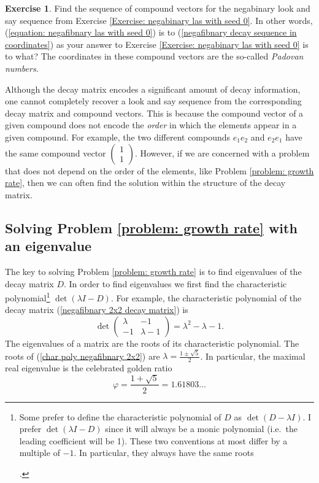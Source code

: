 \documentclass[reqno]{amsart}
\theoremstyle{definition}
\newtheorem{exercise}[theorem]{Exercise}
\begin{document}
\begin{exercise}
    Find the sequence of compound vectors for the negabinary look and say sequence from Exercise \ref{Exercise: negabinary las with seed 0}. In other words, (\ref{equation: negafibnary las with seed 0}) is to (\ref{negafibnary decay sequence in coordinates}) as your answer to Exercise \ref{Exercise: negabinary las with seed 0} is to what? The coordinates in these compound vectors are the so-called \emph{Padovan numbers}.
\end{exercise}

Although the decay matrix encodes a significant amount of decay information, one cannot completely recover a look and say sequence from the corresponding decay matrix and compound vectors. This is because the compound vector of a given compound does not encode the \emph{order} in which the elements appear in a given compound. For example, the two different compounds $e_1e_2$ and $e_2e_1$ have the same compound vector 
$\begin{pmatrix}
    1 \\ 1
\end{pmatrix}$. 
However, if we are concerned with a problem that does not depend on the order of the elements, like Problem \ref{problem: growth rate}, then we can often find the solution within the structure of the decay matrix. 


\subsection{Solving Problem \ref{problem: growth rate} with an eigenvalue}
The key to solving Problem \ref{problem: growth rate} is to find eigenvalues of the decay matrix $D$.  In order to find eigenvalues we first find the characteristic polynomial\footnote{Some prefer to define the characteristic polynomial of $D$ as $\det(D-\lambda I)$. I prefer $\det(\lambda I -D)$ since it will always be a monic polynomial (i.e.~the leading coefficient will be 1). These two conventions at most differ by a multiple of $-1$. In particular, they always have the same roots


.} $\det(\lambda I - D)$. For example, the characteristic polynomial of the decay matrix (\ref{negafibnary 2x2 decay matrix}) is 
\begin{equation}\label{char poly negafibnary 2x2}
    \det\begin{pmatrix}
    \lambda & -1 \\
    -1      & \lambda - 1
    \end{pmatrix}
    =\lambda^2 - \lambda - 1.
\end{equation}
The eigenvalues of a matrix are the roots of its characteristic polynomial. The roots of (\ref{char poly negafibnary 2x2}) are $\lambda = \frac{1\pm\sqrt{5}}{2}$. In particular, the maximal real eigenvalue is the celebrated golden ratio
\begin{equation}\label{phi}
    \varphi=\frac{1+\sqrt{5}}{2} = 1.61803\ldots
\end{equation}
\end{document}
